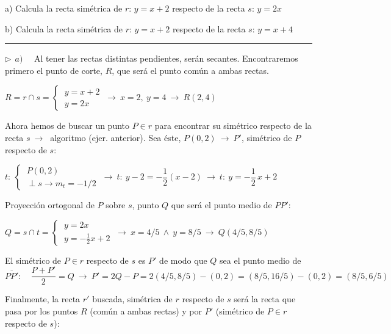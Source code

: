 \begin{miejercicio}

a) Calcula la recta simétrica de $r:\, y=x+2$ respecto de la recta $s:\, y=2x$

\vspace{2mm} b) Calcula la recta simétrica de $r:\, y=x+2$ respecto de la recta $s:\, y=x+4$

\rule{250pt}{0.1pt}

\vspace{2mm} $\triangleright \ \ a)\quad $ Al tener las rectas distintas pendientes, serán secantes. Encontraremos primero el punto de corte, $R$, que será el punto común a ambas rectas.

\vspace{2mm} $R=r\cap s=\begin{cases} \ y=x+2 \\ \ y=2x \end{cases} \ \to \ x=2,\ y=4 \ \to \ R(2,4)$

\vspace{2mm} Ahora hemos de buscar un punto $P\in r$ para encontrar su simétrico respecto de la recta $s \ \to \ $ algoritmo (ejer. anterior). Sea éste, $P(0,2) \  \to   \ P'$, simétrico de $P$ respecto de $s$:

\vspace{2mm} $t:\ \begin{cases} \ P(0,2) \\ \ \perp s \to m_t=-1/2 \end{cases} \ \to \ t:\ y-2=-\dfrac 12 (x-2) \ \to \ t:\ y=-\dfrac 1 2 \, x+2$

\vspace{2mm} Proyección ortogonal de $P$ sobre $s$, punto $Q$ que será el punto medio de $PP'$: 

\vspace{2mm}$Q=s\cap t  = \begin{cases} \ y=2x \\ \ y=-\frac 1 2 x+2 \end{cases} \ \to \ x=4/5 \ \wedge \ y=8/5 \ \to \ Q(4/5,8/5)$

\vspace{2mm} El simétrico de $P\in r$ respecto de $s$ es $P'$ de modo que $Q$ sea el punto medio de $\overline{PP'}: \quad \dfrac{P+P'}{2}=Q \ \to \ P'=2Q-P=2(4/5,8/5)-(0,2)=(8/5,16/5)-(0,2)=(8/5,6/5)$

\vspace{2mm} Finalmente, la recta $r'$ buscada, simétrica de $r$ respecto de $s$ será la recta que pasa por los puntos $R$ (común a ambas rectas) y por $P'$ (simétrico de $P\in r$ respecto de $s$):


\end{miejercicio}
